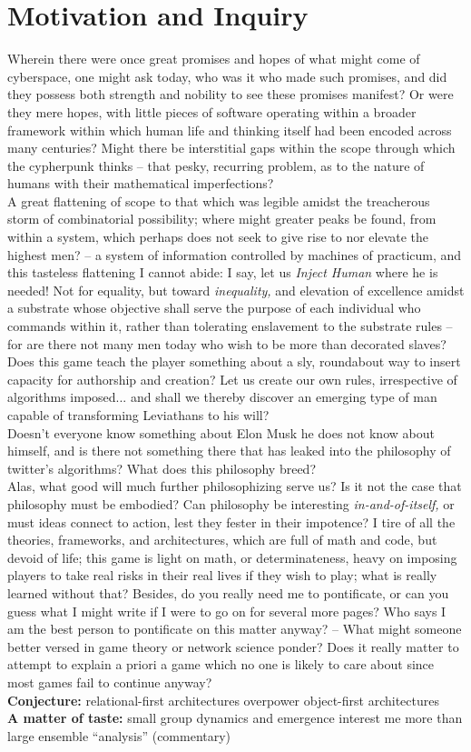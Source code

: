 \documentclass{article}
\begin{document}
\section{Motivation and Inquiry}

Wherein there were once great promises and hopes of what might come of cyberspace, one might ask today, who was it who made such promises, and did they possess both strength and nobility to see these promises manifest? Or were they mere hopes, with little pieces of software operating within a broader framework within which human life and thinking itself had been encoded across many centuries? Might there be interstitial gaps within the scope through which the cypherpunk thinks -- that pesky, recurring problem, as to the nature of humans with their mathematical imperfections?\\ 

A great flattening of scope to that which was legible amidst the treacherous storm of combinatorial possibility; where might greater peaks be found, from within a system, which perhaps does not seek to give rise to nor elevate the highest men? -- a system of information controlled by machines of practicum, and this tasteless flattening I cannot abide: I say, let us \textit{Inject Human} where he is needed! Not for equality, but toward \textit{inequality,} and elevation of excellence amidst a substrate whose objective shall serve the purpose of each individual who commands within it, rather than tolerating enslavement to the substrate rules -- for are there not many men today who wish to be more than decorated slaves? Does this game teach the player something about a sly, roundabout way to insert capacity for authorship and creation? Let us create our own rules, irrespective of algorithms imposed... and shall we thereby discover an emerging type of man capable of transforming Leviathans to his will? \\

Doesn't everyone know something about Elon Musk he does not know about himself, and is there not something there that has leaked into the philosophy of twitter's algorithms? What does this philosophy breed?\\

Alas, what good will much further philosophizing serve us? Is it not the case that philosophy must be embodied? Can philosophy be interesting \textit{in-and-of-itself,} or must ideas connect to action, lest they fester in their impotence? I tire of all the theories, frameworks, and architectures, which are full of math and code, but devoid of life; this game is light on math, or determinateness, heavy on imposing players to take real risks in their real lives if they wish to play; what is really learned without that? Besides, do you really need me to pontificate, or can you guess what I might write if I were to go on for several more pages? Who says I am the best person to pontificate on this matter anyway? -- What might someone better versed in game theory or network science ponder? Does it really matter to attempt to explain a priori a game which no one is likely to care about since most games fail to continue anyway?\\

\noindent \textbf{Conjecture:} relational-first architectures overpower object-first architectures\\

\noindent \textbf{A matter of taste:} small group dynamics and emergence interest me more than large ensemble ``analysis'' (commentary)
\end{document}
